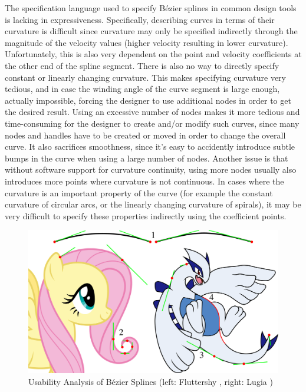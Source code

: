 \documentclass[a4paper]{article}
\begin{document}
				The specification language used to specify Bézier splines in common design tools is lacking in expressiveness. Specifically, describing curves in terms of their curvature is difficult since curvature may only be specified indirectly through the magnitude of the velocity values (higher velocity resulting in lower curvature). Unfortunately, this is also very dependent on the point and velocity coefficients at the other end of the spline segment. There is also no way to directly specify constant or linearly changing curvature. This makes specifying curvature very tedious, and in case the winding angle of the curve segment is large enough, actually impossible, forcing the designer to use additional nodes in order to get the desired result. Using an excessive number of nodes makes it more tedious and time-consuming for the designer to create and/or modify such curves, since many nodes and handles have to be created or moved in order to change the overall curve. It also sacrifices smoothness, since it's easy to accidently introduce subtle bumps in the curve when using a large number of nodes. Another issue is that without software support for curvature continuity, using more nodes usually also introduces more points where curvature is not continuous. In cases where the curvature is an important property of the curve (for example the constant curvature of circular arcs, or the linearly changing curvature of spirals), it may be very difficult to specify these properties indirectly using the coefficient points.

				\begin{figure}[htb]
					\centering
					\includegraphics[width=\textwidth]{../resources/usability_bezier.pdf}
					\caption{Usability Analysis of Bézier Splines (left: Fluttershy \cite{fluttershy}, right: Lugia \cite{lugia})}
					\label{figure:usability_bézier}
				\end{figure}
\end{document}
